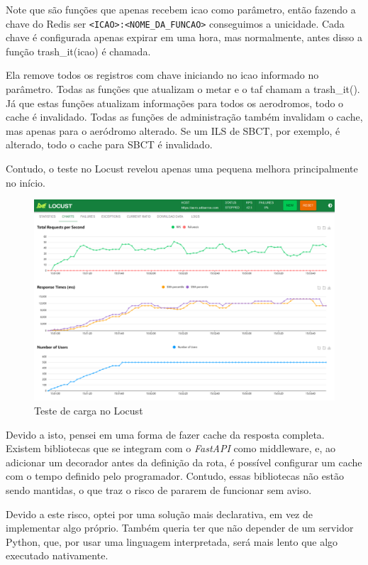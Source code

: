 Note que são funções que apenas recebem icao como parâmetro, então fazendo a chave
do Redis ser \verb|<ICAO>:<NOME_DA_FUNCAO>| conseguimos a unicidade. Cada chave é 
configurada apenas expirar em uma hora, mas normalmente, antes disso a função
trash\_it(icao) é chamada.

Ela remove todos os registros com chave iniciando no
icao informado no parâmetro. Todas as funções que atualizam o metar e o taf chamam
a trash\_it(). Já que estas funções atualizam informações para todos os aerodromos,
todo o cache é invalidado. Todas as funções de administração também invalidam o cache,
mas apenas para 
o aeródromo alterado. Se um ILS de SBCT, por exemplo, é alterado, todo o cache
para SBCT é invalidado.

Contudo, o teste no Locust revelou apenas uma pequena melhora principalmente no
início.

\begin{figure}[ht]
    \begin{center}
    \includegraphics[width=400pt]{img/locust-cache-redis.png}
    \caption{Teste de carga no Locust}
    \label{fig:locust-no-cache}
    \end{center}
\end{figure}

Devido a isto, 
pensei em uma forma de fazer cache da resposta completa. Existem bibliotecas que 
se integram com o \textit{FastAPI} como middleware, e, ao adicionar um decorador antes da
definição da rota, é possível configurar um cache com o tempo definido pelo 
programador. Contudo, essas bibliotecas não estão sendo mantidas, o que traz o 
risco de pararem de funcionar sem aviso.

Devido a este risco, optei por uma solução mais declarativa, em vez de implementar
algo próprio. Também queria ter que não depender de um servidor Python, que, por
usar uma linguagem interpretada, será mais lento que algo executado nativamente.

